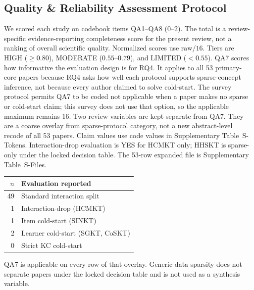 \documentclass[lettersize,journal]{IEEEtran}
\begin{document}
\subsection{Quality \& Reliability Assessment Protocol}
We scored each study on codebook items QA1--QA8 ($0$--$2$). The total is a review-specific evidence-reporting completeness score for the present review, not a ranking of overall scientific quality. Normalized scores use $\mathrm{raw}/16$. Tiers are HIGH ($\ge 0.80$), MODERATE ($0.55$--$0.79$), and LIMITED ($< 0.55$).
QA7 scores how informative the evaluation design is for RQ4. It applies to all 53 primary-core papers because RQ4 asks how well each protocol supports sparse-concept inference, not because every author claimed to solve cold-start. The survey protocol permits QA7 to be coded not applicable when a paper makes no sparse or cold-start claim; this survey does not use that option, so the applicable maximum remains $16$.
Two review variables are kept separate from QA7. They are a coarse overlay from sparse-protocol category, not a new abstract-level recode of all 53 papers. Claim values use code values in Supplementary Table~S-Tokens. Interaction-drop evaluation is YES for HCMKT only; HHSKT is sparse-only under the locked decision table. The 53-row expanded file is Supplementary Table~S-Files.
\begin{center}
\footnotesize
\begin{tabular}{@{}rl@{}}
\toprule
$n$ & Evaluation reported \\
\midrule
49 & Standard interaction split \\
1 & Interaction-drop (HCMKT) \\
1 & Item cold-start (SINKT) \\
2 & Learner cold-start (SGKT, CoSKT) \\
0 & Strict KC cold-start \\
\bottomrule
\end{tabular}
\end{center}
QA7 is applicable on every row of that overlay. Generic data sparsity does not separate papers under the locked decision table and is not used as a synthesis variable.
\end{document}
